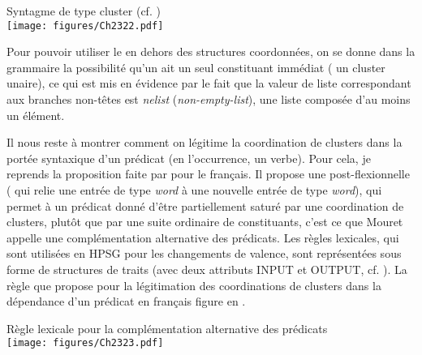 \ea \label{ch2:ex322}
Syntagme de type cluster (cf. \citealt{Mouret2006,Mouret2007})\\
\texttt{[image: figures/Ch2322.pdf]}


\z

\largerpage
Pour pouvoir utiliser le  en dehors des structures coordonnées, on se donne dans la grammaire la possibilité qu’un  ait un seul constituant immédiat ({\cad} un cluster unaire), ce qui est mis en évidence par le fait que la valeur de liste correspondant aux branches non-têtes est \textit{nelist} (\textit{non-empty-list}), {\cad} une liste composée d’au moins un élément. 

Il nous reste à montrer comment on légitime la coordination de clusters dans la portée syntaxique d’un prédicat (en l’occurrence, un verbe). Pour cela, je reprends la proposition faite par \citet{Mouret2006,Mouret2007} pour le français. Il propose une  post-flexionnelle ({\cad} qui relie une entrée de type \textit{word} à une nouvelle entrée de type \textit{word}), qui permet à un prédicat donné d’être partiellement saturé par une coordination de clusters, plutôt que par une suite ordinaire de constituants, c’est ce que Mouret appelle une complémentation alternative des prédicats. Les règles lexicales, qui sont utilisées en HPSG pour les changements de valence, sont représentées sous forme de structures de traits (avec deux attributs  INPUT et OUTPUT, cf. \citealt{BriscoeEtAl1999}). La règle que \citet{Mouret2006,Mouret2007} propose pour la légitimation des coordinations de clusters dans la dépendance d’un prédicat en français figure en . 

\ea \label{ch2:ex323}
Règle lexicale pour la complémentation alternative des prédicats\\
\texttt{[image: figures/Ch2323.pdf]}

